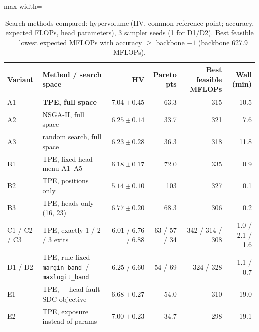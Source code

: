 \documentclass[10pt,a4paper]{article}
\newcommand{\meth}[1]{\texttt{#1}}
\newcommand{\ours}{\meth{margin\_band}}
\begin{document}
\begin{table}[H]
\centering\small
\caption{Search methods compared: hypervolume (HV, common reference point; accuracy, expected FLOPs, head
parameters), 3 sampler seeds (1 for D1/D2). Best feasible = lowest expected MFLOPs with accuracy $\ge$
backbone $-1$ (backbone 627.9 MFLOPs).}
\begin{adjustbox}{max width=\linewidth}
\begin{tabular}{@{}llrrrr@{}}
\toprule
Variant & Method / search space & HV & Pareto pts & Best feasible MFLOPs & Wall (min) \\
\midrule
A1 & \textbf{TPE, full space}             & $\mathbf{7.04\pm0.45}$ & 63.3 & 315 & 10.5 \\
A2 & NSGA-II, full space                  & $6.25\pm0.14$ & 33.7 & 321 & 7.6 \\
A3 & random search, full space            & $6.23\pm0.28$ & 36.3 & 318 & 11.8 \\
B1 & TPE, fixed head menu A1--A5          & $6.18\pm0.17$ & 72.0 & 335 & 0.9 \\
B2 & TPE, positions only                  & $5.14\pm0.10$ & 103  & 327 & 0.1 \\
B3 & TPE, heads only (16, 23)             & $6.77\pm0.20$ & 68.3 & 306 & 0.2 \\
C1 / C2 / C3 & TPE, exactly 1 / 2 / 3 exits & $6.01$ / $6.76$ / $6.88$ & 63 / 57 / 34 & 342 / 314 / 308 & 1.0 / 2.1 / 1.6 \\
D1 / D2 & TPE, rule fixed \ours\ / \meth{maxlogit\_band} & $6.25$ / $6.60$ & 54 / 69 & 324 / 328 & 1.1 / 0.7 \\
E1 & TPE, + head-fault SDC objective      & $6.68\pm0.27$ & 54.0 & 310 & 19.0 \\
E2 & TPE, exposure instead of params      & $7.00\pm0.23$ & 34.7 & 298 & 19.1 \\
\bottomrule
\end{tabular}
\end{adjustbox}
\end{table}
\end{document}
